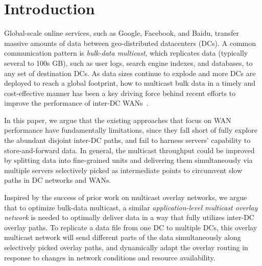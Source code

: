 \section{Introduction}

Global-scale online services, such as Google, Facebook, and 
Baidu, transfer massive amounts of data between geo-distributed 
datacenters (DCs). 
A common communication pattern is {\em bulk-data multicast}, 
which replicates data 
(typically several to 100s GB), such as user 
logs, search engine indexes, and databases, 
to any set of destination DCs. 
As data sizes continue to explode and more DCs are deployed to 
reach a global footprint, how to multicast bulk data in a timely 
and cost-effective manner has been a key driving force behind 
recent efforts to improve the performance of inter-DC 
WANs~\cite{jain2013b4,kumar2015bwe,hong2013achieving,
Zhang2015Guaranteeing,Savage1999The}.



In this paper, we argue that the existing approaches that focus 
on WAN performance have fundamentally limitations, 
since they fall short of fully explore the abundant 
disjoint inter-DC paths, and fail to harness servers' 
capability to store-and-forward data.
In general, the multicast throughput could be improved by
splitting data into fine-grained units and delivering them 
simultaneously via multiple servers selectively picked as 
intermediate points to circumvent slow paths in DC
networks and WANs.


Inspired by the success of prior work on multicast overlay 
networks, we argue that to optimize bulk-data multicast, 
a similar {\em application-level multicast 
overlay network} is needed to optimally deliver data in a way that 
fully utilizes inter-DC overlay paths. 
To replicate a data file from one DC to multiple DCs, this overlay
multicast network will send different parts of the data 
simultaneously along selectively picked overlay paths, and 
dynamically adapt the overlay routing in response to changes in 
network conditions and resource availability.


